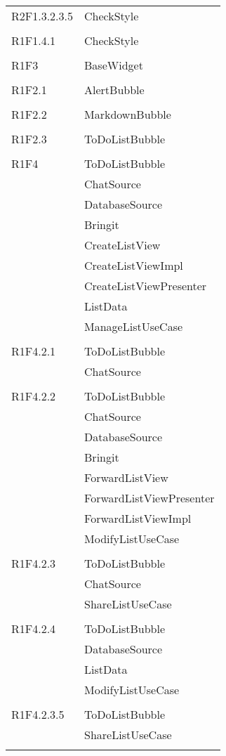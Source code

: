 \begin{center}
\begin{longtable}{|p{7cm}|p{7cm}|}
		R2F1.3.2.3.5 & CheckStyle \\ & \\ \hline
		R1F1.4.1 & CheckStyle \\ & \\ \hline
		R1F3 & BaseWidget \\ & \\ \hline
		R1F2.1 & AlertBubble \\ & \\ \hline
		R1F2.2 & MarkdownBubble \\ & \\ \hline
		R1F2.3 & ToDoListBubble \\ & \\ \hline
		R1F4 & ToDoListBubble \\ & ChatSource \\ & DatabaseSource \\ & Bringit \\ & CreateListView \\ & CreateListViewImpl \\ & CreateListViewPresenter \\ & ListData \\ & ManageListUseCase \\ & \\ \hline
		R1F4.2.1 & ToDoListBubble \\ & ChatSource \\ & \\ \hline
		R1F4.2.2 & ToDoListBubble \\ & ChatSource \\ & DatabaseSource \\ & Bringit \\ & ForwardListView \\ & ForwardListViewPresenter \\ & ForwardListViewImpl \\ & ModifyListUseCase \\ & \\ \hline
		R1F4.2.3 & ToDoListBubble \\ & ChatSource \\ & ShareListUseCase \\ & \\ \hline
		R1F4.2.4 & ToDoListBubble \\ & DatabaseSource \\ & ListData \\ & ModifyListUseCase \\ & \\ \hline
		R1F4.2.3.5 & ToDoListBubble \\ & ShareListUseCase \\ & \\ \hline

\end{longtable}
\end{center}
